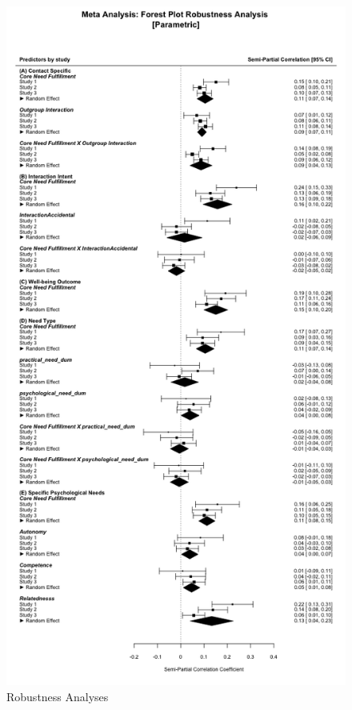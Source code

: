 \documentclass[man, 12pt, a4paper, mask]{apa7}
\theoremstyle{break}
\theoremstyle{plain}
\begin{document}
\begin{figure}
  \caption{Robustness Analyses}
  \label{fig:Robustness}
  \centering\includegraphics[width=\textwidth]{Figures/forestParametricRobustnessComb.png}

\end{figure}
\end{document}
